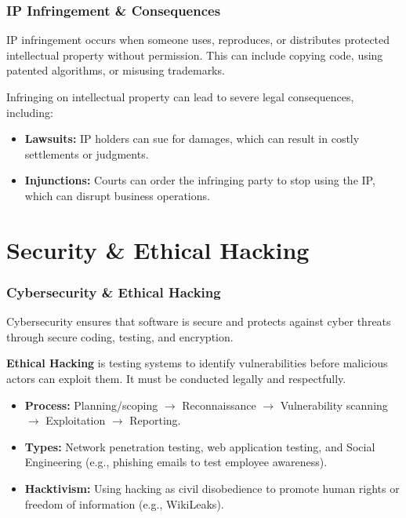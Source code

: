 \documentclass[xcolor=table]{beamer}
\begin{document}
\begin{frame}
    \frametitle{IP Infringement \& Consequences}
    \small
    IP infringement occurs when someone uses, reproduces, or distributes protected intellectual property without permission. This can include copying code, using patented algorithms, or misusing trademarks.

    \vspace{0.2cm}
    Infringing on intellectual property can lead to severe legal consequences, including:
    \begin{itemize}
        \item \textbf{Lawsuits:} IP holders can sue for damages, which can result in costly settlements or judgments.
        \item \textbf{Injunctions:} Courts can order the infringing party to stop using the IP, which can disrupt business operations.
    \end{itemize}

\end{frame}

\section{Security \& Ethical Hacking}

\begin{frame}
    \frametitle{Cybersecurity \& Ethical Hacking}
    \small
    Cybersecurity ensures that software is secure and protects against cyber threats through secure coding, testing, and encryption.
    
    \vspace{0.2cm}
    \textbf{Ethical Hacking} is testing systems to identify vulnerabilities before malicious actors can exploit them. It must be conducted legally and respectfully.
    
    \begin{itemize}
        \item \textbf{Process:} Planning/scoping $\rightarrow$ Reconnaissance $\rightarrow$ Vulnerability scanning $\rightarrow$ Exploitation $\rightarrow$ Reporting.
        \item \textbf{Types:} Network penetration testing, web application testing, and Social Engineering (e.g., phishing emails to test employee awareness).
        \item \textbf{Hacktivism:} Using hacking as civil disobedience to promote human rights or freedom of information (e.g., WikiLeaks).
    \end{itemize}
\end{frame}
\end{document}
